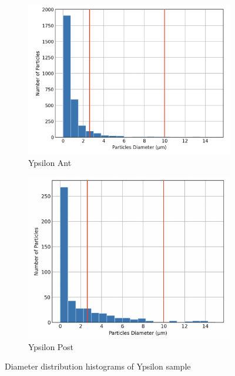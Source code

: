 \begin{figure}[H]
\centering
\begin{subfigure}{.5\textwidth}
  \centering
  \includegraphics[width=1\linewidth]{images/Ypsilon_Ant_D.png}
  \caption{Ypsilon Ant}
  \label{fig:ypsilonant}
\end{subfigure}%
\begin{subfigure}{.5\textwidth}
  \centering
  \includegraphics[width=0.9\linewidth]{images/Ypsilon_Post_D.png}
  \caption{Ypsilon Post}
  \label{fig:ypsilonpost}
\end{subfigure}
\caption{Diameter distribution histograms of Ypsilon sample}
\label{fig:4}
\end{figure}

